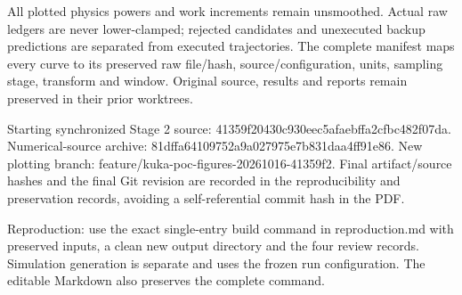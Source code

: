 \documentclass[10pt,letterpaper]{article}
\begin{document}
All plotted physics powers and work increments remain unsmoothed. Actual raw ledgers are never lower-clamped; rejected candidates and unexecuted backup predictions are separated from executed trajectories. The complete manifest maps every curve to its preserved raw file/hash, source/configuration, units, sampling stage, transform and window. Original source, results and reports remain preserved in their prior worktrees.


Starting synchronized Stage 2 source: 41359f20430c930eec5afaebffa2cfbc482f07da. Numerical-source archive: 81dffa64109752a9a027975e7b831daa4ff91e86. New plotting branch: feature/kuka-poc-figures-20261016-41359f2. Final artifact/source hashes and the final Git revision are recorded in the reproducibility and preservation records, avoiding a self-referential commit hash in the PDF.


Reproduction: use the exact single-entry build command in reproduction.md with preserved inputs, a clean new output directory and the four review records. Simulation generation is separate and uses the frozen run configuration. The editable Markdown also preserves the complete command.
\end{document}
